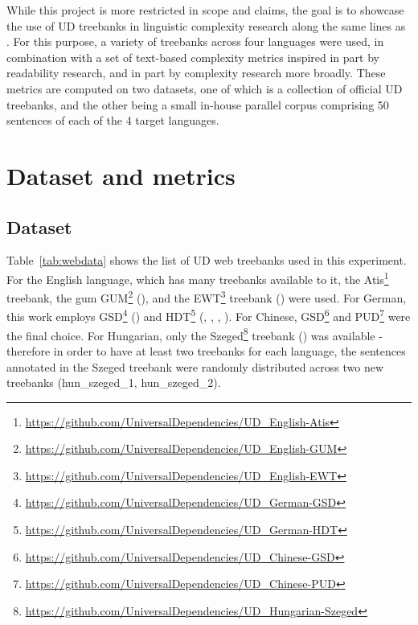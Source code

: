 \documentclass[11pt]{article}
\begin{document}
While this project is more restricted in scope and claims, the goal is to showcase the use of UD treebanks in linguistic complexity research along the same lines as \citealp{berdicevskis-etal-2018-using}. For this purpose, a variety of treebanks across four languages were used, in combination with a set of text-based complexity metrics inspired in part by readability research, and in part by complexity research more broadly. These metrics are computed on two datasets, one of which is a collection of official UD treebanks, and the other being a small in-house parallel corpus comprising 50 sentences of each of the 4 target languages.

\section{Dataset and metrics}

\subsection{Dataset}




Table~\ref{tab:webdata} shows the list of UD web treebanks used in this experiment. For the English language, which has many treebanks available to it, the Atis\footnote{\url{https://github.com/UniversalDependencies/UD_English-Atis}} treebank, the gum GUM\footnote{\url{https://github.com/UniversalDependencies/UD_English-GUM}} (\citealp{berzak2016tle}), and the EWT\footnote{\url{https://github.com/UniversalDependencies/UD_English-EWT}} treebank (\citealp{silveira14gold}) were used. For German, this work employs GSD\footnote{\url{https://github.com/UniversalDependencies/UD_German-GSD}} (\citealp{mcdonald-etal-2013-universal}) and HDT\footnote{\url{https://github.com/UniversalDependencies/UD_German-HDT}} (\citealp{borges-volker-etal-2019-hdt}, \citealp{hennig-kohn-2017-dependency}, \citealp{hdtextra}, \citealp{hdtguide}). For Chinese, GSD\footnote{\url{https://github.com/UniversalDependencies/UD_Chinese-GSD}} and PUD\footnote{\url{https://github.com/UniversalDependencies/UD_Chinese-PUD}} were the final choice. For Hungarian, only the Szeged\footnote{\url{https://github.com/UniversalDependencies/UD_Hungarian-Szeged}} treebank (\citealp{szeged}) was available - therefore in order to have at least two treebanks for each language, the sentences annotated in the Szeged treebank were randomly distributed across two new treebanks (hun\_szeged\_1, hun\_szeged\_2).
\end{document}
